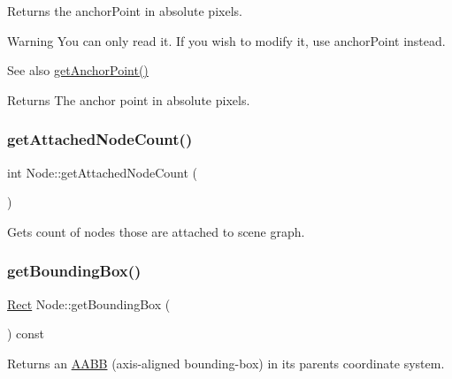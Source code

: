 Returns the anchor\+Point in absolute pixels.

\begin{DoxyWarning}{Warning}
You can only read it. If you wish to modify it, use anchor\+Point instead. 
\end{DoxyWarning}
\begin{DoxySeeAlso}{See also}
{\ttfamily \hyperlink{classNode_a391027410f7f45889938090feb631cba}{get\+Anchor\+Point()}}
\end{DoxySeeAlso}
\begin{DoxyReturn}{Returns}
The anchor point in absolute pixels. 
\end{DoxyReturn}
\mbox{\label{classNode_a8e964e787155dc3fcb2ff47ec7f75eb3}} 
\subsubsection{\texorpdfstring{get\+Attached\+Node\+Count()}{getAttachedNodeCount()}}
{\footnotesize\ttfamily int Node\+::get\+Attached\+Node\+Count (\begin{DoxyParamCaption}{ }\end{DoxyParamCaption})\hspace{0.3cm}{\ttfamily [static]}}

Gets count of nodes those are attached to scene graph. \mbox{\label{classNode_a7b3849315467fdb992b273fbd3b3fc66}} 
\subsubsection{\texorpdfstring{get\+Bounding\+Box()}{getBoundingBox()}\hspace{0.1cm}{\footnotesize\ttfamily [1/2]}}
{\footnotesize\ttfamily \hyperlink{classRect}{Rect} Node\+::get\+Bounding\+Box (\begin{DoxyParamCaption}{ }\end{DoxyParamCaption}) const\hspace{0.3cm}{\ttfamily [virtual]}}

Returns an \hyperlink{classAABB}{A\+A\+BB} (axis-\/aligned bounding-\/box) in its parent\textquotesingle{}s coordinate system.

